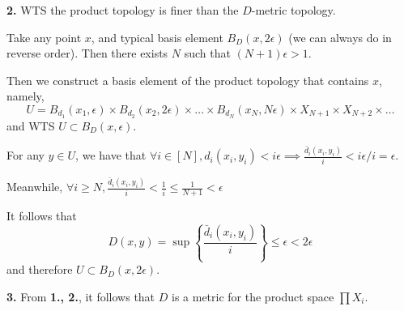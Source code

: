 \documentclass[a4paper, 12pt]{article}
\begin{document}
\begin{solution}
    \textbf{2.} WTS the product topology is finer than the $D$-metric topology.

    Take any point $x$, and typical basis element $B_{D}(x, 2\epsilon)$ (we can always do in reverse order). Then there exists $N$ such that $(N+1)\epsilon > 1$.

    Then we construct a basis element of the product topology that contains $x$, namely,\begin{equation*}
    U = B_{d_1}(x_1, \epsilon) \times B_{d_2}(x_2, 2\epsilon) \times \ldots \times B_{d_N}(x_N, N\epsilon) \times X_{N+1} \times X_{N+2} \times \ldots
    \end{equation*}
    and WTS $U \subset B_{D}(x, \epsilon)$.

    For any $y \in U$, we have that $\forall i \in [N], d_i(x_i, y_i) < i\epsilon \implies \frac{\bar{d}_i (x_i, y_i) }{i} < i\epsilon/i = \epsilon $.

    Meanwhile, $\forall i \geq N, \frac{\bar{d}_i (x_i, y_i) }{i} < \frac{1}{i} \leq \frac{1}{N+1} < \epsilon$

    It follows that \begin{equation*}
    D(x, y)  = \sup \left\{\frac{\bar{d}_i(x_i, y_i)}{i}\right\} \leq \epsilon < 2\epsilon
    \end{equation*}
    and therefore $U \subset B_D(x, 2\epsilon)$.

    \textbf{3.} From \textbf{1., 2.}, it follows that $D$ is a metric for the product space $\prod X_i$.
\end{solution}
\end{document}
